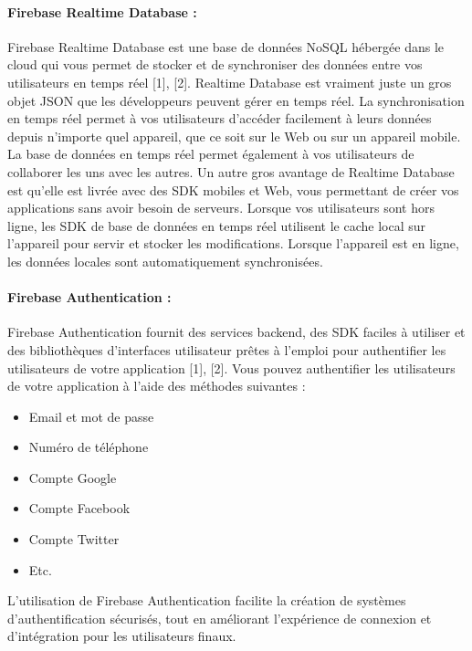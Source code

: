 \paragraph{Firebase Realtime Database :\newline}


 Firebase Realtime Database est une base de données NoSQL hébergée dans le cloud qui vous
permet de stocker et de synchroniser des données entre vos utilisateurs en temps réel [1], [2].
Realtime Database est vraiment juste un gros objet JSON que les développeurs peuvent gérer
en temps réel.
La synchronisation en temps réel permet à vos utilisateurs d'accéder facilement à leurs données
depuis n'importe quel appareil, que ce soit sur le Web ou sur un appareil mobile. La base de
données en temps réel permet également à vos utilisateurs de collaborer les uns avec les autres.
Un autre gros avantage de Realtime Database est qu'elle est livrée avec des SDK mobiles et
Web, vous permettant de créer vos applications sans avoir besoin de serveurs. Lorsque vos
utilisateurs sont hors ligne, les SDK de base de données en temps réel utilisent le cache local
sur l'appareil pour servir et stocker les modifications. Lorsque l'appareil est en ligne, les données
locales sont automatiquement synchronisées.
\paragraph{Firebase Authentication :\newline}
Firebase Authentication fournit des services backend, des SDK faciles à utiliser et des
bibliothèques d'interfaces utilisateur prêtes à l'emploi pour authentifier les utilisateurs de votre
application [1], [2].
Vous pouvez authentifier les utilisateurs de votre application à l'aide des méthodes suivantes :
\begin{itemize}[label=$\ast$]
	\item Email et mot de passe
	\item Numéro de téléphone
	\item Compte Google
	\item Compte Facebook
	\item Compte Twitter
	\item Etc.
\end{itemize}
L'utilisation de Firebase Authentication facilite la création de systèmes d'authentification
sécurisés, tout en améliorant l'expérience de connexion et d'intégration pour les utilisateurs
finaux.
